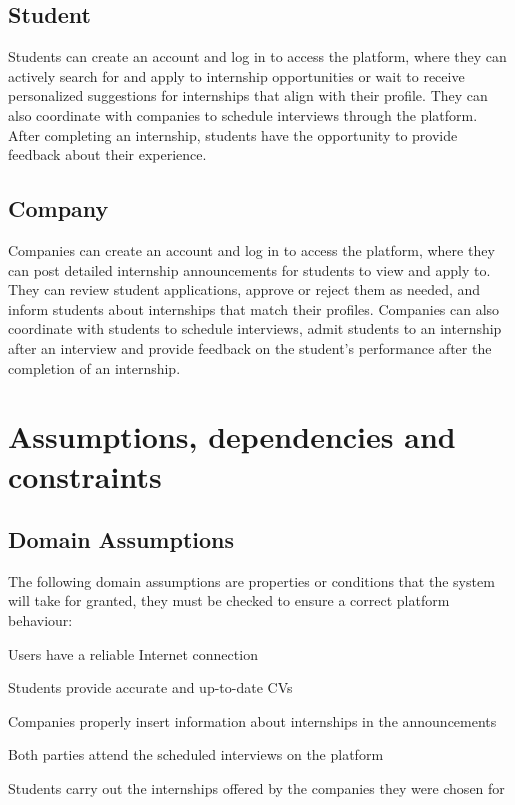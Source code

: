 \subsection{Student }
Students can create an account and log in to access the platform, where they can actively search for and apply to internship opportunities or wait to receive personalized suggestions for internships that align with their profile. They can also coordinate with companies to schedule interviews through the platform. After completing an internship, students have the opportunity to provide feedback about their experience.
\subsection{Company }
Companies can create an account and log in to access the platform, where they can post detailed internship announcements for students to view and apply to. They can review student applications, approve or reject them as needed, and inform students about internships that match their profiles. Companies can also coordinate with students to schedule interviews, admit students to an internship after an interview and provide feedback on the student’s performance after the completion of an internship.

\newpage
\section{Assumptions, dependencies and constraints }
\subsection{Domain Assumptions }
The following domain assumptions are properties or conditions that the system will take for granted, they must be checked to ensure a correct platform behaviour:
\begin{enumerate}[label={[D\arabic{enumi}]}]
    \item Users have a reliable Internet connection
    \item Students provide accurate and up-to-date CVs
    \item Companies properly insert information about internships in the announcements
    \item Both parties attend the scheduled interviews on the platform
    \item Students carry out the internships offered by the companies they were chosen for
\end{enumerate}

